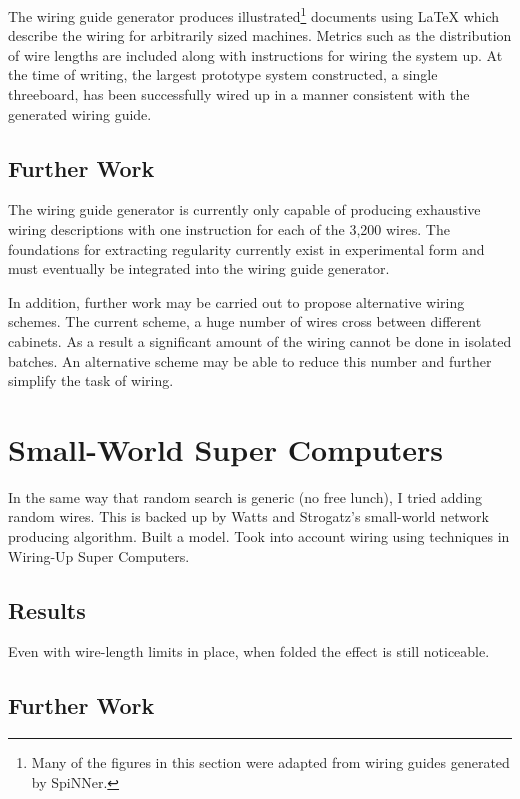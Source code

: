 			The wiring guide generator produces illustrated\footnote{Many of the
			figures in this section were adapted from wiring guides generated by
			SpiNNer.} documents using \LaTeX{} which describe the wiring for
			arbitrarily sized machines. Metrics such as the distribution of wire
			lengths are included along with instructions for wiring the system up. At
			the time of writing, the largest prototype system constructed, a single
			threeboard, has been successfully wired up in a manner consistent with the
			generated wiring guide.
		
		\subsection{Further Work}
			
			
			The wiring guide generator is currently only capable of producing
			exhaustive wiring descriptions with one instruction for each of the 3,200
			wires. The foundations for extracting regularity currently exist in
			experimental form and must eventually be integrated into the wiring guide
			generator.
			
			In addition, further work may be carried out to propose alternative wiring
			schemes. The current scheme, a huge number of wires cross between
			different cabinets. As a result a significant amount of the wiring cannot
			be done in isolated batches. An alternative scheme may be able to reduce
			this number and further simplify the task of wiring.
	
	\section{Small-World Super Computers}
		
		In the same way that random search is generic (no free lunch), I tried
		adding random wires. This is backed up by Watts and Strogatz's small-world
		network producing algorithm. Built a model. Took into account wiring using
		techniques in Wiring-Up Super Computers.
		
		\subsection{Results}
			
			Even with wire-length limits in place, when folded the effect is still
			noticeable.
		
		\subsection{Further Work}
			
